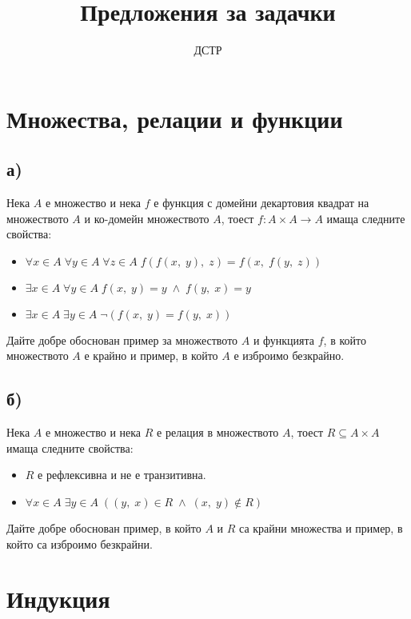 \documentclass[a4paper, 12pt, oneside]{article}
\title{Предложения за задачки}
\author{ДСТР}
\begin{document}
\maketitle

\section*{Множества, релации и функции}

\subsection*{а)}

Нека $A$ е множество и нека $f$ е функция с домейни декартовия квадрат на множеството $A$
и ко-домейн множеството $A$, тоест $f : A \times A \to A$ имаща следните свойства:

\begin{itemize} 
    \item $\forall x \in A \; \forall y \in A \; \forall z \in A \; f(f(x, \; y), \; z) = f(x, \; f(y, \; z)) $
    \item $\exists x \in A \; \forall y \in A \; f(x, \; y) = y \; \land \; f(y, \; x) = y $
    \item $\exists x \in A \; \exists y \in A \; \lnot (f(x, \; y) = f(y, \; x))  $ 
\end{itemize}

Дайте добре обоснован пример за множеството $A$ и функцията $f$, в който множеството $A$ е крайно и пример, в който $A$ е изброимо безкрайно.

\subsection*{б)}

Нека $A$ е множество и нека $R$ е релация в множеството $A$, тоест $R \subseteq A \times A$ имаща следните свойства:

\begin{itemize} 
    \item $R$ е рефлексивна и не е транзитивна.
    \item $\forall x \in A \; \exists y \in A \; \left((y, \; x) \in R \; \land \; (x, \; y) \notin R \right) $
\end{itemize}

Дайте добре обоснован пример, в който $A$ и $R$ са крайни множества и пример, в който са изброимо безкрайни.

\section*{Индукция}
\end{document}
